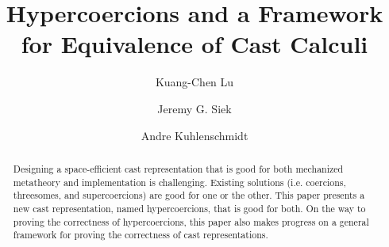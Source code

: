 \documentclass[acmsmall,review,anonymous]{acmart}\settopmatter{printfolios=true,printccs=false,printacmref=false}
\begin{document}
\title{Hypercoercions and a Framework for Equivalence of Cast Calculi}


\author{Kuang-Chen Lu}



\author{Jeremy G. Siek}


\author{Andre Kuhlenschmidt}


\begin{abstract}
  Designing a space-efficient cast representation that is good for
  both mechanized metatheory and implementation is
  challenging. Existing solutions (i.e. coercions, threesomes, and 
  supercoercions) are good for one or the other. This
  paper presents a new cast representation, named hypercoercions, that
  is good for both. On the way to proving the correctness of
  hypercoercions, this paper also makes progress on a general
  framework for proving the correctness of cast representations.
\end{abstract}
\end{document}
